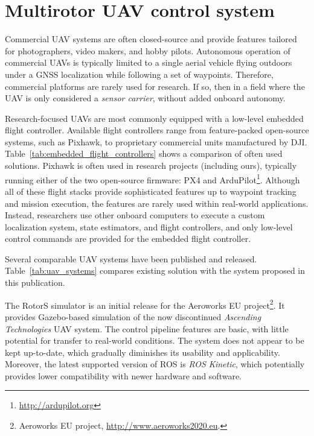 \documentclass[a4paper,11pt,twoside,openright]{book}
\begin{document}

\section{Multirotor UAV control system}

Commercial \ac{UAV} systems are often closed-source and provide features tailored for photographers, video makers, and hobby pilots.
Autonomous operation of commercial \acp{UAV} is typically limited to a single aerial vehicle flying outdoors under a \ac{GNSS} localization while following a set of waypoints.
Therefore, commercial platforms are rarely used for research.
If so, then in a field where the \ac{UAV} is only considered a \emph{sensor carrier}, without added onboard autonomy.

Research-focused \acp{UAV} are most commonly equipped with a low-level embedded flight controller.
Available flight controllers \cite{ebeid2018survey} range from feature-packed open-source systems, such as Pixhawk, to proprietary commercial units manufactured by DJI.
Table~\ref{tab:embedded_flight_controllers} shows a comparison of often used solutions.
Pixhawk is often used in research projects (including ours), typically running either of the two open-source firmware: PX4 \cite{meier2015px4} and ArduPilot\footnote{\url{http://ardupilot.org}}.
Although all of these flight stacks provide sophisticated features up to waypoint tracking and mission execution, the features are rarely used within real-world applications.
Instead, researchers use other onboard computers to execute a custom localization system, state estimators, and flight controllers, and only low-level control commands are provided for the embedded flight controller.

Several comparable \ac{UAV} systems have been published and released.
Table~\ref{tab:uav_systems} compares existing solution with the system proposed in this publication.

The RotorS \cite{furrer2016rotors} simulator is an initial release for the Aeroworks EU project\footnote{Aeroworks EU project, \url{http://www.aeroworks2020.eu}.}.
It provides Gazebo-based simulation of the now discontinued \emph{Ascending Technologies} \ac{UAV} system.
The control pipeline features are basic, with little potential for transfer to real-world conditions.
The system does not appear to be kept up-to-date, which gradually diminishes its usability and applicability.
Moreover, the latest supported version of ROS is \emph{ROS Kinetic}, which potentially provides lower compatibility with newer hardware and software.
\end{document}
